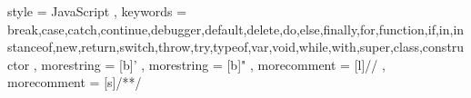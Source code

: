 
{
    style             = JavaScript
,   keywords          = {break,case,catch,continue,debugger,default,delete,do,else,finally,for,function,if,in,instanceof,new,return,switch,throw,try,typeof,var,void,while,with,super,class,constructor}
,   morestring        = [b]'
,   morestring        = [b]"
,   morecomment       = [l]{//}
,   morecomment       = [s]{/*}{*/}
}

{
}
